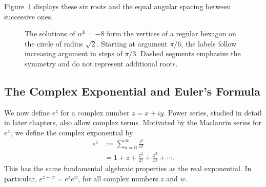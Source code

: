 Figure~\ref{fig:sixth-roots-minus-eight} displays these six roots and the equal angular spacing between successive ones.

\begin{figure}[!htbp]
\centering
{}
\caption[The six sixth roots of minus eight]{The solutions of $w^6=-8$ form the vertices of a regular hexagon on the circle of radius $\sqrt{2}$. Starting at argument $\pi/6$, the labels follow increasing argument in steps of $\pi/3$. Dashed segments emphasize the symmetry and do not represent additional roots.}
\label{fig:sixth-roots-minus-eight}
\end{figure}

\subsection{The Complex Exponential and Euler's Formula}


We now define $e^z$ for a complex number $z = x+iy$. Power series, studied in detail in later chapters, also allow complex terms.
Motivated by the Maclaurin series for $e^x$, we define the complex exponential by
\[
\begin{aligned}
e^z &:= \sum_{n=0}^{\infty} \frac{z^n}{n!} \\
&= 1 + z + \frac{z^2}{2!} + \frac{z^3}{3!} + \cdots.
\end{aligned}
\]
This has the same fundamental algebraic properties as the real exponential. In particular, $e^{z+w} = e^z e^w$, for all complex numbers $z$ and $w$.


